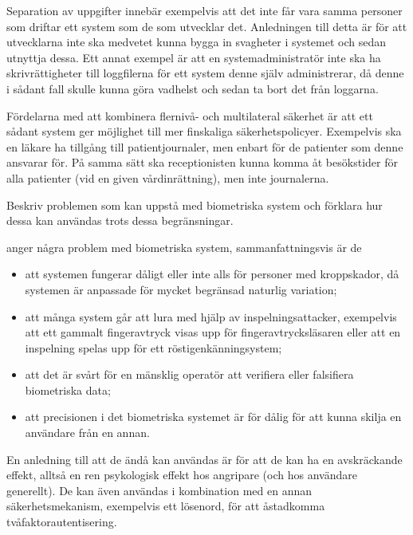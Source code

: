 \documentclass[a4paper,addpoints]{miunexam}
\begin{document}
\begin{questions}
\begin{solution}
    Separation av uppgifter innebär exempelvis att det inte får vara samma 
    personer som driftar ett system som de som utvecklar det.
    Anledningen till detta är för att utvecklarna inte ska medvetet kunna bygga 
    in svagheter i systemet och sedan utnyttja dessa.
    Ett annat exempel är att en systemadministratör inte ska ha 
    skrivrättigheter till loggfilerna för ett system denne själv administrerar, 
    då denne i sådant fall skulle kunna göra vadhelst och sedan ta bort det 
    från loggarna.

    Fördelarna med att kombinera flernivå- och multilateral säkerhet är att ett 
    sådant system ger möjlighet till mer finskaliga säkerhetspolicyer.
    Exempelvis ska en läkare ha tillgång till patientjournaler, men enbart för 
    de patienter som denne ansvarar för.
    På samma sätt ska receptionisten kunna komma åt besökstider för alla 
    patienter (vid en given vårdinrättning), men inte journalerna.
  \end{solution}

  \question[4]\label{q:biometrics}
  Beskriv problemen som kan uppstå med biometriska system och förklara hur 
  dessa kan användas trots dessa begränsningar.

  \begin{solution}
    \citet{Anderson2008sea} anger några problem med biometriska system, 
    sammanfattningsvis är de
    \begin{itemize}
      \item att systemen fungerar dåligt eller inte alls för personer med 
        kroppskador, då systemen är anpassade för mycket begränsad naturlig 
        variation;
      \item att många system går att lura med hjälp av inspelningsattacker, 
        exempelvis att ett gammalt fingeravtryck visas upp för 
        fingeravtrycksläsaren eller att en inspelning spelas upp för ett 
        röstigenkänningsystem;
      \item att det är svårt för en mänsklig operatör att verifiera eller 
        falsifiera biometriska data;
      \item att precisionen i det biometriska systemet är för dålig för att 
        kunna skilja en användare från en annan.
    \end{itemize}

    En anledning till att de ändå kan användas är för att de kan ha en 
    avskräckande effekt, alltså en ren psykologisk effekt hos angripare (och 
    hos användare generellt).
    De kan även användas i kombination med en annan säkerhetsmekanism, 
    exempelvis ett lösenord, för att åstadkomma tvåfaktorautentisering.
  \end{solution}

\end{questions}

\printbibliography
\end{document}
